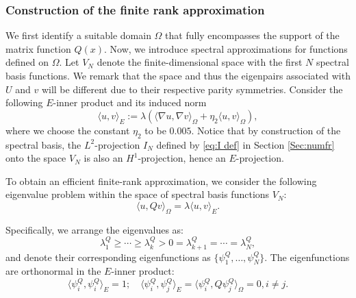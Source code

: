 \documentclass[11pt,a4paper]{article}
\numberwithin{equation}{section}
\newcommand{\assign}{:=}
\begin{document}
\subsubsection{Construction of the finite rank approximation}
We first identify a suitable domain $\Omega$ that fully encompasses the
support of the matrix function $Q (x)$. %
Now, we introduce spectral approximations for functions
defined on $\Omega$. Let $V_N$ denote the finite-dimensional space with the first $N$ spectral basis functions. We remark that the space and thus the eigenpairs associated with $U$ and $v$ will be different due to their respective parity symmetries. %
Consider the following $E$-inner product and its induced norm \[\langle u, v \rangle_{E}\assign\lambda(\langle \nabla u, \nabla v \rangle_{\Omega}+\eta_2\langle u, v \rangle_{\Omega}),\] where we choose the constant $\eta_2$ to be $0.005$. Notice that by construction of the spectral basis, the $L^2$-projection $I_N$ defined by \eqref{eq:I def} in Section \ref{Sec:numfr} onto the space $V_N$ is also an $H^1$-projection, hence an $E$-projection.

To obtain an efficient finite-rank approximation, we consider the following
eigenvalue problem within the space of spectral  basis functions $V_N$:
\begin{equation}
  \langle u, Q v \rangle_{\Omega} = \lambda \langle u, v \rangle_{E} .
  \label{eq:eig M}
\end{equation}

Specifically, we arrange the eigenvalues as:
\[ \lambda^{Q}_{1} \geqslant\cdots\geqslant \lambda^{Q}_k > 0 = \lambda^{Q}_{k+1} = \cdots
  = \lambda^{Q}_N, \]
and denote their corresponding eigenfunctions as $\{ \psi^{Q}_{1}, \ldots,
\psi^{Q}_N \}$. The
eigenfunctions are orthonormal in  the $E$-inner
product:
\[
  \langle \psi^{Q}_i, \psi^{Q}_i \rangle_{E} = 1;\quad
  \langle \psi^{Q}_i, \psi^{Q}_j \rangle_{E} = \langle \psi^{Q}_i, Q \psi^{Q}_j
  \rangle_{\Omega} = 0, i \neq j.
\]
\end{document}
